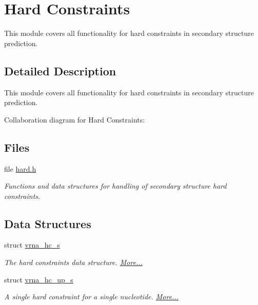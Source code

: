 \hypertarget{group__hard__constraints}{}\section{Hard Constraints}
\label{group__hard__constraints}


This module covers all functionality for hard constraints in secondary structure prediction.  




\subsection{Detailed Description}
This module covers all functionality for hard constraints in secondary structure prediction. 

Collaboration diagram for Hard Constraints\+:
\subsection*{Files}
\begin{DoxyCompactItemize}
\item 
file \mbox{\hyperlink{hard_8h}{hard.\+h}}
\begin{DoxyCompactList}\small\item\em Functions and data structures for handling of secondary structure hard constraints. \end{DoxyCompactList}\end{DoxyCompactItemize}
\subsection*{Data Structures}
\begin{DoxyCompactItemize}
\item 
struct \mbox{\hyperlink{group__hard__constraints_structvrna__hc__s}{vrna\+\_\+hc\+\_\+s}}
\begin{DoxyCompactList}\small\item\em The hard constraints data structure.  \mbox{\hyperlink{group__hard__constraints_structvrna__hc__s}{More...}}\end{DoxyCompactList}\item 
struct \mbox{\hyperlink{group__hard__constraints_structvrna__hc__up__s}{vrna\+\_\+hc\+\_\+up\+\_\+s}}
\begin{DoxyCompactList}\small\item\em A single hard constraint for a single nucleotide.  \mbox{\hyperlink{group__hard__constraints_structvrna__hc__up__s}{More...}}\end{DoxyCompactList}\end{DoxyCompactItemize}
